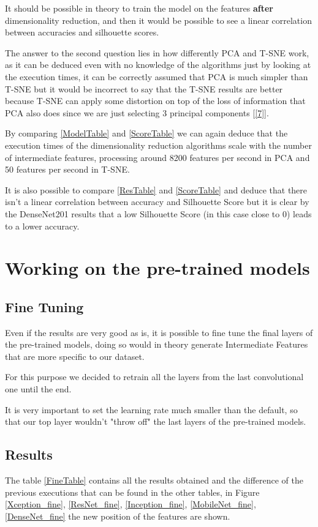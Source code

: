 \documentclass[conference]{IEEEtran}
\begin{document}
It should be possible in theory to train the model on the features \textbf{after} dimensionality reduction, and then it would be possible to see a linear correlation between accuracies and silhouette scores.

The answer to the second question lies in how differently PCA and T-SNE work, as it can be deduced even with no knowledge of the algorithms just by looking at the execution times, it can be correctly assumed that PCA is much simpler than T-SNE but it would be incorrect to say that the T-SNE results are better because T-SNE can apply some distortion on top of the loss of information that PCA also does since we are just selecting 3 principal components [\ref{7}]. 

By comparing \ref{ModelTable} and \ref{ScoreTable} we can again deduce that the execution times of the dimensionality reduction algorithms scale with the number of intermediate features, processing around 8200 features per second in PCA and 50 features per second in T-SNE.

It is also possible to compare \ref{ResTable} and \ref{ScoreTable} and deduce that there isn't a linear correlation between accuracy and Silhouette Score but it is clear by the DenseNet201 results that a low Silhouette Score (in this case close to 0) leads to a lower accuracy.

\section{Working on the pre-trained models}
\subsection{Fine Tuning}
Even if the results are very good as is, it is possible to fine tune the final layers of the pre-trained models, doing so would in theory generate Intermediate Features that are more specific to our dataset.

For this purpose we decided to retrain all the layers from the last convolutional one until the end.

It is very important to set the learning rate much smaller than the default, so that our top layer wouldn't "throw off" the last layers of the pre-trained models.
\subsection{Results}
The table \ref{FineTable} contains all the results obtained and the difference of the previous executions that can be found in the other tables, in Figure \ref{Xception_fine}, \ref{ResNet_fine}, \ref{Inception_fine}, \ref{MobileNet_fine}, \ref{DenseNet_fine} the new position of the features are shown.
\end{document}
